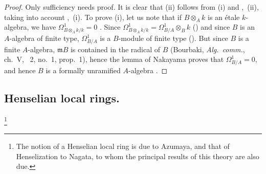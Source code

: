 \begin{proof}
Only sufficiency needs proof.
It is clear that (ii) follows from (i) and ,~(ii), taking into account ,~(i).
To prove (i), let us note that if $B\otimes_A k$ is an \'etale $k$-algebra, we have $\Omega^1_{B\otimes_A k/k}=0$ .
Since $\Omega^1_{B\otimes_A k/k}=\Omega^1_{B/A}\otimes_B k$ () and since $B$ is an $A$-algebra of finite type, $\Omega^1_{B/A}$ is a $B$-module of finite type ().
But since $B$ is a finite $A$-algebra, $\mathfrak{m}B$ is contained in the radical of $B$ (Bourbaki, \emph{Alg.\ comm.}, ch.~V, \textsection~2, no.~1, prop.~1), hence the lemma of Nakayama proves that $\Omega^1_{B/A}=0$, and hence $B$ is a formally unramified $A$-algebra .
\end{proof}


\subsection{Henselian local rings.}
\label{subsection:IV.18.5}
\footnote{The notion of a Henselian local ring is due to Azumaya, and that of Henselization to Nagata, to whom the principal results of this theory are also due.}

